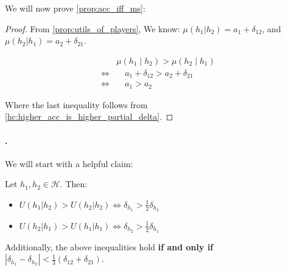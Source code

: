 We will now prove \cref{prop:acc_iff_ms}:
\begin{proof}
    From \cref{prop:utils_of_players}, We know:
    $\mu(h_1|h_2) = a_{1} + \delta_{12}$, and 
    $\mu(h_2|h_{1}) = a_2 + \delta_{21}$.

    \begin{equation}
    \begin{aligned}        
     \quad & \mu(h_1 \mid h_2) > \mu(h_2 \mid h_1) 
     \\
     \Leftrightarrow &
     \quad a_{1} + \delta_{12} > a_2 + \delta_{21} 
    \\
    \Leftrightarrow &
    \quad a_1 > a_2 
    \end{aligned}
    \end{equation}

    Where the last inequality follows from \cref{hc:higher_acc_is_higher_partial_delta}.
\end{proof}

\paragraph{.}
We will start with a helpful claim:
\begin{helpful_claim}
\label{hc:pne_inequalities}
    Let $h_1,h_2 \in \mathcal{H}$.
    Then: 
    \begin{itemize}[leftmargin=0.5cm]
        \item $ U(h_1|h_2) > U(h_2|h_2) \Leftrightarrow \delta_{h_1} > \frac{1}{2}\delta_{h_2} $ 
        \item $ U(h_2|h_1) > U(h_1|h_1) \Leftrightarrow \delta_{h_2} > \frac{1}{2}\delta_{h_1} $ 
    \end{itemize}
    Additionally, the above inequalities hold \textbf{if and only if} $|\delta_{h_1} - \delta_{h_2}| < \frac{1}{3}(\delta_{12}+\delta_{21})$.   
\end{helpful_claim}

